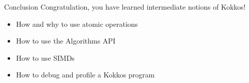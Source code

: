 \documentclass[
    aspectratio=169,
    \createHandout
]{beamer}
\begin{document}
\begin{frame}{Conclusion}
    Congratulation, you have learned intermediate notions of Kokkos!

    \begin{itemize}
        \item How and why to use atomic operations
        \item How to use the Algorithms API
        \item How to use SIMDs
        \item How to debug and profile a Kokkos program
    \end{itemize}
\end{frame}

\end{document}
